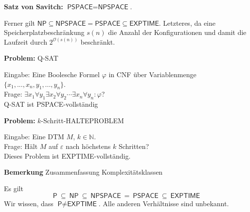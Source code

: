 \documentclass[a4paper,graphics,11pt]{article}
\newcommand{\eps}[0]{\varepsilon}
\begin{document}
\textbf{Satz von Savitch:} $\textsf{PSPACE} = \textsf{NPSPACE}$.

Ferner gilt $\textsf{NP} \subseteq \textsf{NPSPACE} = \textsf{PSPACE} \subseteq \textsf{EXPTIME}$.
Letzteres, da eine Speicherplatzbeschränkung $s(n)$ die Anzahl der Konfigurationen und damit die Laufzeit
durch $2^{\mathcal{O}(s(n))}$ beschränkt.


\newpage

\textbf{Problem:} Q-SAT

Eingabe: Eine Boolesche Formel $\varphi$ in CNF über Variablenmenge $\{x_1,...,x_n,y_1,...,y_n\}$.
\\[10pt]
Frage: $\exists x_1 \forall y_1 \exists x_2 \forall y_2 \cdots \exists x_n \forall y_n : \varphi$?
\\[10pt]
Q-SAT ist \textsf{PSPACE}-vollständig

\strut

\textbf{Problem:} $k$-Schritt-HALTEPROBLEM

Eingabe: Eine DTM $M$, $k \in \mathbb{N}$.
\\[10pt]
Frage: Hält $M$ auf $\eps$ nach höchstens $k$ Schritten?
\\[10pt]
Dieses Problem ist \textsf{EXPTIME}-vollständig.

\strut

\textbf{Bemerkung} Zusammenfassung Komplexitätsklassen

Es gilt
$$
    \textsf{P}\ \subseteq\ \textsf{NP}\ \subseteq\ \textsf{NPSPACE}\ =\ \textsf{PSPACE}\ \subseteq\ \textsf{EXPTIME}
$$
Wir wissen, dass $\textsf{P} \neq \textsf{EXPTIME}$. Alle anderen Verhältnisse sind unbekannt.
\end{document}
